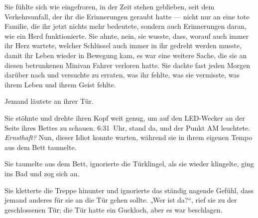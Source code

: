 Sie fühlte sich wie eingefroren, in der Zeit stehen geblieben, seit dem Verkehrsunfall, der ihr die Erinnerungen geraubt hatte — nicht nur an eine tote Familie, die ihr jetzt nichts mehr bedeutete, sondern auch Erinnerungen daran, wie ein Herd funktionierte.
Sie ahnte, nein, sie wusste, dass, worauf auch immer ihr Herz wartete, welcher Schlüssel auch immer in ihr gedreht werden musste, damit ihr Leben wieder in Bewegung kam, es war eine weitere Sache, die sie an diesen betrunkenen Minivan Fahrer verloren hatte. Sie dachte fast jeden Morgen darüber nach und versuchte zu erraten, was ihr fehlte, was sie vermisste, was ihrem Leben und ihrem Geist fehlte.

Jemand läutete an ihrer Tür.

Sie stöhnte und drehte ihren Kopf weit genug, um auf den LED-Wecker an der Seite ihres Bettes zu schauen.
6:31~Uhr, stand da, und der Punkt AM leuchtete.
\emph{Ernsthaft?} Nun, dieser Idiot konnte warten, während sie in ihrem eigenen Tempo aus dem Bett taumelte.

Sie taumelte aus dem Bett, ignorierte die Türklingel, als sie wieder klingelte, ging ins Bad und zog sich an.

Sie kletterte die Treppe hinunter und ignorierte das ständig nagende Gefühl, dass jemand anderes für sie an die Tür gehen sollte.
„Wer ist da?“, rief sie zu der geschlossenen Tür; die Tür hatte ein Guckloch, aber es war beschlagen.

